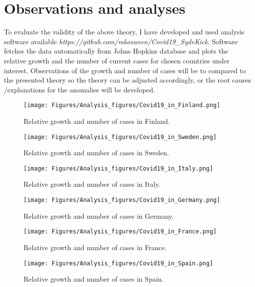 \chapter{Observations and analyses}\label{chap:observations}
To evaluate the validity of the above theory, I have developed and used analysis software
available \emph{https://github.com/mkosunen/Covid19\_SydeKick}. Software
fetches the data automatically from Johns Hopkins database and plots the
relative growth and the number of current cases for chosen countries under
interest. Observations of the growth and number of cases will be to compared
to the presented theory so the theory can be adjusted accordingly, or the
root causes /explanations for the anomalies will be developed. 

\begin{figure}
    \centering
    \texttt{[image: Figures/Analysis\_figures/Covid19\_in\_Finland.png]}
    \caption{Relative growth and number of cases in Finland.}\label{fig:Finland}
\end{figure}

\begin{figure}
    \centering
    \texttt{[image: Figures/Analysis\_figures/Covid19\_in\_Sweden.png]}
    \caption{Relative growth and number of cases in Sweden.}\label{fig:Sweden}
\end{figure}

\begin{figure}
    \centering
    \texttt{[image: Figures/Analysis\_figures/Covid19\_in\_Italy.png]}
    \caption{Relative growth and number of cases in Italy.}\label{fig:Italy}
\end{figure}

\begin{figure}
    \centering
    \texttt{[image: Figures/Analysis\_figures/Covid19\_in\_Germany.png]}
    \caption{Relative growth and number of cases in Germany.}\label{fig:Germany}
\end{figure}

\begin{figure}
    \centering
    \texttt{[image: Figures/Analysis\_figures/Covid19\_in\_France.png]}
    \caption{Relative growth and number of cases in France.}\label{fig:France}
\end{figure}

\begin{figure}
    \centering
    \texttt{[image: Figures/Analysis\_figures/Covid19\_in\_Spain.png]}
    \caption{Relative growth and number of cases in Spain.}\label{fig:Spain}
\end{figure}

